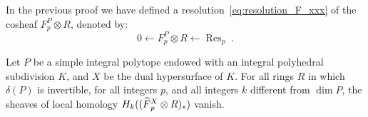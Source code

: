\documentclass[AHL,Unicode,longabstracts,published]{cedram}
\DeclareMathOperator{\Res}{Res}
\newcommand{\Fbar}{\hat{F}}
\let\oldhat\hat
\renewcommand*{\hat}[1]{\mathchoice{\widehat{#1}}{\widehat{#1}}{\oldhat{#1}}{\oldhat{#1}}}
\begin{document}
\begin{rema}\label{rmk:resolution_F0}
In the previous proof we have defined a resolution~\eqref{eq:resolution_F_xxx} of the cosheaf $F^P_p\otimes R$, denoted by:
\begin{equation*}
0\leftarrow F^P_p\otimes R \leftarrow \Res_p\;.
\end{equation*}
\end{rema}

\begin{prop}\label{prop:preparation_F1_1st_position}
Let $P$ be a simple integral polytope endowed with an integral polyhedral subdivision $K$, and $X$ be the dual hypersurface of $K$. For all rings $R$ in which $\delta(P)$ is invertible, for all integers $p$, and all integers $k$ different from $\dim P$, the sheaves of local homology $H_k((\Fbar_p^X\otimes R)_*)$ vanish.
\end{prop}
\end{document}

